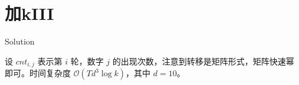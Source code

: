 \section{加kIII}

\begin{frame}{Solution}

设 $cnt_{i,j}$ 表示第 $i$ 轮，数字 $j$ 的出现次数，注意到转移是矩阵形式，矩阵快速幂即可。时间复杂度 $\mathcal O(Td^3\log k)$，其中 $d=10$。

\end{frame}